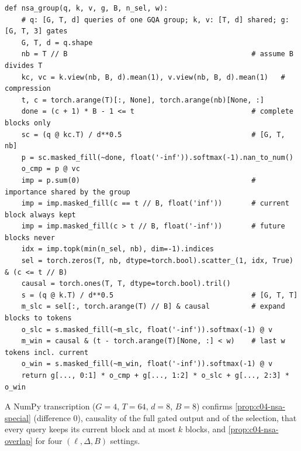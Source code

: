 \begin{lstlisting}[caption={Reference implementation (ours): the three NSA branches for one GQA group.},label={lst:c04-nsa-ref}]
def nsa_group(q, k, v, g, B, n_sel, w):
    # q: [G, T, d] queries of one GQA group; k, v: [T, d] shared; g: [G, T, 3] gates
    G, T, d = q.shape
    nb = T // B                                            # assume B divides T
    kc, vc = k.view(nb, B, d).mean(1), v.view(nb, B, d).mean(1)   # compression
    t, c = torch.arange(T)[:, None], torch.arange(nb)[None, :]
    done = (c + 1) * B - 1 <= t                            # complete blocks only
    sc = (q @ kc.T) / d**0.5                               # [G, T, nb]
    p = sc.masked_fill(~done, float('-inf')).softmax(-1).nan_to_num()
    o_cmp = p @ vc
    imp = p.sum(0)                                         # importance shared by the group
    imp = imp.masked_fill(c == t // B, float('inf'))       # current block always kept
    imp = imp.masked_fill(c > t // B, float('-inf'))       # future blocks never
    idx = imp.topk(min(n_sel, nb), dim=-1).indices
    sel = torch.zeros(T, nb, dtype=torch.bool).scatter_(1, idx, True) & (c <= t // B)
    causal = torch.ones(T, T, dtype=torch.bool).tril()
    s = (q @ k.T) / d**0.5                                 # [G, T, T]
    m_slc = sel[:, torch.arange(T) // B] & causal          # expand blocks to tokens
    o_slc = s.masked_fill(~m_slc, float('-inf')).softmax(-1) @ v
    m_win = causal & (t - torch.arange(T)[None, :] < w)    # last w tokens incl. current
    o_win = s.masked_fill(~m_win, float('-inf')).softmax(-1) @ v
    return g[..., 0:1] * o_cmp + g[..., 1:2] * o_slc + g[..., 2:3] * o_win
\end{lstlisting}

A NumPy transcription ($G=4$, $T=64$, $d=8$, $B=8$) confirms \cref{prop:c04-nsa-special}
(difference $0$), causality of the full gated output and of the selection, that every query keeps
its current block and at most $k$ blocks, and \cref{prop:c04-nsa-overlap} for four $(\ell,\Delta,B)$
settings.

